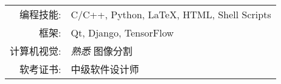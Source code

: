 %
%


 
\renewcommand{\arraystretch}{1.1}

	\begin{tabular}{>{}r>{}p{13cm}} 
		\textsc{编程技能:}      &  C/C++, Python, \LaTeX, HTML, Shell Scripts\\  
		\textsc{框架:} 		&  Qt, Django, TensorFlow\\
		\textsc{计算机视觉:}	   &  \emph{熟悉}  图像分割  \\
		\textsc{软考证书:}	    &  中级软件设计师\\
	\end{tabular}
	
